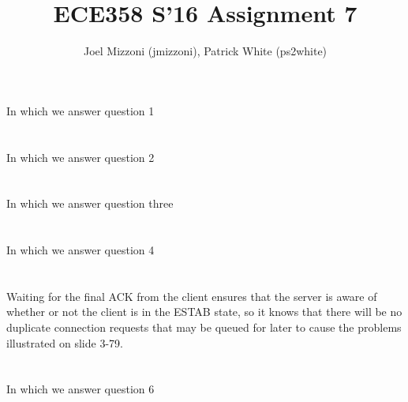 \documentclass[10pt,a4paper]{article}
\author{Joel Mizzoni (jmizzoni), Patrick White (ps2white)}
\begin{document}
\title{ECE358 S'16 Assignment 7}
\maketitle
\section{}
In which we answer question 1
\section{}
In which we answer question 2
\section{}
In which we answer question three
\section{}
In which we answer question 4
\section{}

Waiting for the final ACK from the client ensures that the server is aware of whether or not the client is in the ESTAB state, so it knows that there will be no duplicate connection requests that may be queued for later to cause the problems illustrated on slide 3-79.

\section{}
In which we answer question 6
\end{document}
